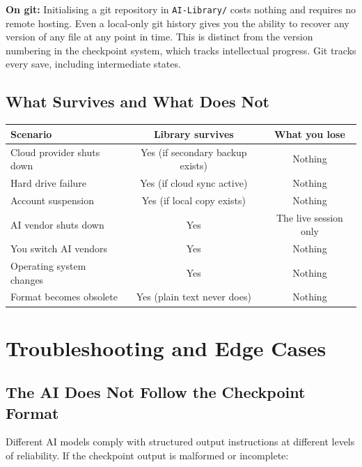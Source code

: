 \documentclass[12pt,letterpaper]{article}
\begin{document}
\begin{mdframed}[style=notebox]
\textbf{On git:} Initialising a git repository in \texttt{AI-Library/} costs
nothing and requires no remote hosting. Even a local-only git history gives
you the ability to recover any version of any file at any point in time.
This is distinct from the version numbering in the checkpoint system,
which tracks intellectual progress. Git tracks every save, including
intermediate states.
\end{mdframed}

\subsection{What Survives and What Does Not}

\begin{center}
\begin{tabular}{@{}lcc@{}}
\toprule
\textbf{Scenario} & \textbf{Library survives} & \textbf{What you lose} \\
\midrule
Cloud provider shuts down & Yes (if secondary backup exists) & Nothing \\
Hard drive failure & Yes (if cloud sync active) & Nothing \\
Account suspension & Yes (if local copy exists) & Nothing \\
AI vendor shuts down & Yes & The live session only \\
You switch AI vendors & Yes & Nothing \\
Operating system changes & Yes & Nothing \\
Format becomes obsolete & Yes (plain text never does) & Nothing \\
\bottomrule
\end{tabular}
\end{center}

\section{Troubleshooting and Edge Cases}

\subsection{The AI Does Not Follow the Checkpoint Format}

Different AI models comply with structured output instructions at different
levels of reliability. If the checkpoint output is malformed or incomplete:
\end{document}
